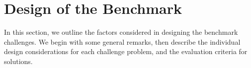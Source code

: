 \documentclass[runningheads]{llncs}
\begin{document}
\section{Design of the Benchmark}\label{sec:design-discussion}

In this section, we outline the factors considered in designing the benchmark challenges.
We begin with some general remarks, then describe the individual design considerations for each challenge problem, and the evaluation criteria for solutions.
\end{document}
